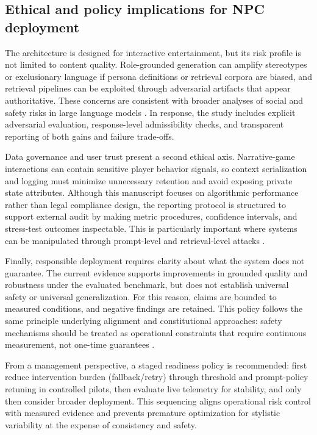 ﻿\documentclass[a4paper,12pt]{article}
\begin{document}
\subsection{Ethical and policy implications for NPC deployment}
The architecture is designed for interactive entertainment, but its risk profile is not limited to content quality. Role-grounded generation can amplify stereotypes or exclusionary language if persona definitions or retrieval corpora are biased, and retrieval pipelines can be exploited through adversarial artifacts that appear authoritative. These concerns are consistent with broader analyses of social and safety risks in large language models \cite{Bender2021Parrots,Weidinger2022Taxonomy}. In response, the study includes explicit adversarial evaluation, response-level admissibility checks, and transparent reporting of both gains and failure trade-offs.

Data governance and user trust present a second ethical axis. Narrative-game interactions can contain sensitive player behavior signals, so context serialization and logging must minimize unnecessary retention and avoid exposing private state attributes. Although this manuscript focuses on algorithmic performance rather than legal compliance design, the reporting protocol is structured to support external audit by making metric procedures, confidence intervals, and stress-test outcomes inspectable. This is particularly important where systems can be manipulated through prompt-level and retrieval-level attacks \cite{Zou2025PoisonedRAG,Chaturvedi2025AIP}.

Finally, responsible deployment requires clarity about what the system does not guarantee. The current evidence supports improvements in grounded quality and robustness under the evaluated benchmark, but does not establish universal safety or universal generalization. For this reason, claims are bounded to measured conditions, and negative findings are retained. This policy follows the same principle underlying alignment and constitutional approaches: safety mechanisms should be treated as operational constraints that require continuous measurement, not one-time guarantees \cite{Bai2022Constitutional}.

From a management perspective, a staged readiness policy is recommended: first reduce intervention burden (fallback/retry) through threshold and prompt-policy retuning in controlled pilots, then evaluate live telemetry for stability, and only then consider broader deployment. This sequencing aligns operational risk control with measured evidence and prevents premature optimization for stylistic variability at the expense of consistency and safety.
\end{document}
